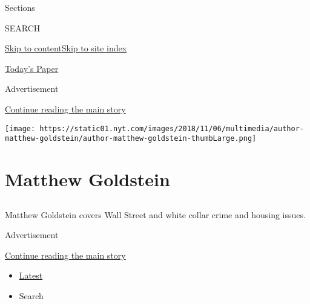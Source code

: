 Sections

SEARCH

\protect\hyperlink{site-content}{Skip to
content}\protect\hyperlink{site-index}{Skip to site index}

\href{https://myaccount.nytimes.com/auth/login?response_type=cookie\&client_id=vi}{}

\href{https://www.nytimes.com/section/todayspaper}{Today's Paper}

Advertisement

\protect\hyperlink{after-top}{Continue reading the main story}

\texttt{[image: https://static01.nyt.com/images/2018/11/06/multimedia/author-matthew-goldstein/author-matthew-goldstein-thumbLarge.png]}

\hypertarget{matthew-goldstein}{%
\section{Matthew Goldstein}\label{matthew-goldstein}}

\subsection{}

Matthew Goldstein covers Wall Street and white collar crime and housing
issues.

Advertisement

\protect\hyperlink{after-mid1}{Continue reading the main story}

\begin{itemize}
\tightlist
\item
  \protect\hyperlink{stream-panel}{Latest}
\item
  Search
\end{itemize}

